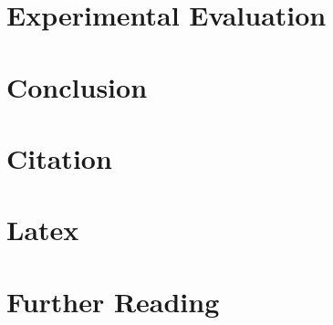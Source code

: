 \documentclass[sigconf]{acmart}
\begin{document}
\section{Experimental Evaluation}
\label{sec:evaluation}


\section{Conclusion}
\label {sec:conclusion}


\section{Citation}
\label{sec:citation}



\section{Latex}
\label{sec:latex} 


\section{Further Reading}
\label{sec:further}




\end{document}
